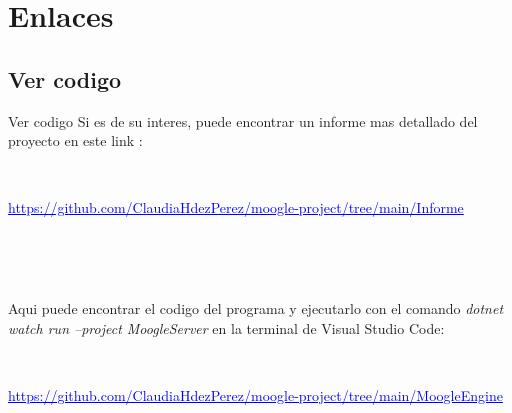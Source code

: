 \section{Enlaces}

\subsection{Ver codigo}
\begin{frame}{Ver codigo}
    Si es de su interes, puede encontrar un informe mas detallado del proyecto en este link :

    \

    \textcolor{blue}{\underline{\scriptsize {https://github.com/ClaudiaHdezPerez/moogle-project/tree/main/Informe}}}

    \

    \

    Aqui puede encontrar el codigo del programa y ejecutarlo con el comando \textit{dotnet watch run --project MoogleServer} en la terminal de Visual Studio Code:

    \

    \textcolor{blue}{\underline{\scriptsize {https://github.com/ClaudiaHdezPerez/moogle-project/tree/main/MoogleEngine}}}
\end{frame}